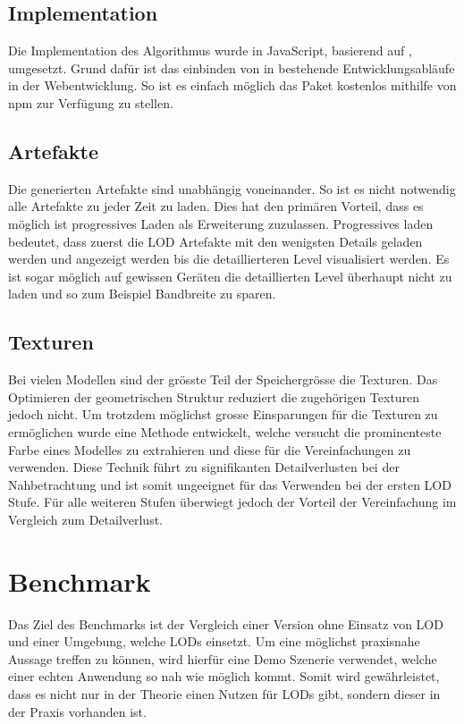 \subsection{Implementation}

Die Implementation des Algorithmus wurde in JavaScript, basierend auf , umgesetzt. Grund dafür ist das einbinden von  in bestehende Entwicklungsabläufe in der Webentwicklung. So ist es einfach möglich das Paket kostenlos mithilfe von \gls{npm} zur Verfügung zu stellen.

\subsection{Artefakte}

Die generierten Artefakte sind unabhängig voneinander. So ist es nicht notwendig alle Artefakte zu jeder Zeit zu laden. Dies hat den primären Vorteil, dass es möglich ist progressives Laden als Erweiterung zuzulassen. Progressives laden bedeutet, dass zuerst die LOD Artefakte mit den wenigsten Details geladen werden und angezeigt werden bis die detaillierteren Level visualisiert werden.
Es ist sogar möglich auf gewissen Geräten die detaillierten Level überhaupt nicht zu laden und so zum Beispiel Bandbreite zu sparen.

\subsection{Texturen}

Bei vielen Modellen sind der grösste Teil der Speichergrösse die Texturen. Das Optimieren der geometrischen Struktur reduziert die zugehörigen Texturen jedoch nicht. Um trotzdem möglichst grosse Einsparungen für die Texturen zu ermöglichen wurde eine Methode entwickelt, welche versucht die prominenteste Farbe eines Modelles zu extrahieren und diese für die Vereinfachungen zu verwenden.
Diese Technik führt zu signifikanten Detailverlusten bei der Nahbetrachtung und ist somit ungeeignet für das Verwenden bei der ersten LOD Stufe. Für alle weiteren Stufen überwiegt jedoch der Vorteil der Vereinfachung im Vergleich zum Detailverlust.

\section{Benchmark}

Das Ziel des Benchmarks ist der Vergleich einer Version ohne Einsatz von LOD und einer Umgebung, welche LODs einsetzt. Um eine möglichst praxisnahe Aussage treffen zu können, wird hierfür eine Demo Szenerie verwendet, welche einer echten Anwendung so nah wie möglich kommt. Somit wird gewährleistet, dass es nicht nur in der Theorie einen Nutzen für LODs gibt, sondern dieser in der Praxis vorhanden ist.

